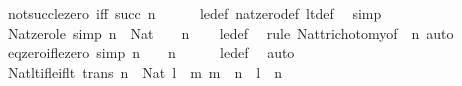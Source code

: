 \begin{isabellebody}
\isanewline
{}\isamarkupfalse%
\ not{\isacharunderscore}{\kern0pt}succ{\isacharunderscore}{\kern0pt}le{\isacharunderscore}{\kern0pt}zero\ {\isacharbrackleft}{\kern0pt}iff{\isacharbrackright}{\kern0pt}{\isacharcolon}{\kern0pt}\ {\isachardoublequoteopen}{\isasymnot}{\isacharparenleft}{\kern0pt}succ\ n\ {\isasymle}\ {}{\isacharparenright}{\kern0pt}{\isachardoublequoteclose}\isanewline
%
\isadelimproof
\ \ %
\endisadelimproof
%
\isatagproof
{}\isamarkupfalse%
\ le{\isacharunderscore}{\kern0pt}def\ nat{\isacharunderscore}{\kern0pt}zero{\isacharunderscore}{\kern0pt}def\ lt{\isacharunderscore}{\kern0pt}def\ \isamarkupfalse%
\ simp%
\endisatagproof
{\isafoldproof}%
%
\isadelimproof
\isanewline
%
\endisadelimproof
\isanewline
{}\isamarkupfalse%
\ Nat{\isacharunderscore}{\kern0pt}zero{\isacharunderscore}{\kern0pt}le\ {\isacharbrackleft}{\kern0pt}simp{\isacharbrackright}{\kern0pt}{\isacharcolon}{\kern0pt}\ {\isachardoublequoteopen}n\ {\isacharcolon}{\kern0pt}\ Nat\ {\isasymLongrightarrow}\ {}\ {\isasymle}\ n{\isachardoublequoteclose}\isanewline
%
\isadelimproof
\ \ %
\endisadelimproof
%
\isatagproof
{}\isamarkupfalse%
\ le{\isacharunderscore}{\kern0pt}def\ \isamarkupfalse%
\ {\isacharparenleft}{\kern0pt}rule\ Nat{\isacharunderscore}{\kern0pt}trichotomy{\isacharbrackleft}{\kern0pt}of\ {}\ n{\isacharbrackright}{\kern0pt}{\isacharparenright}{\kern0pt}\ auto%
\endisatagproof
{\isafoldproof}%
%
\isadelimproof
\isanewline
%
\endisadelimproof
\isanewline
{}\isamarkupfalse%
\ eq{\isacharunderscore}{\kern0pt}zero{\isacharunderscore}{\kern0pt}if{\isacharunderscore}{\kern0pt}le{\isacharunderscore}{\kern0pt}zero\ {\isacharbrackleft}{\kern0pt}simp{\isacharbrackright}{\kern0pt}{\isacharcolon}{\kern0pt}\ {\isachardoublequoteopen}n\ {\isasymle}\ {}\ {\isasymLongrightarrow}\ n\ {\isacharequal}{\kern0pt}\ {}{\isachardoublequoteclose}\isanewline
%
\isadelimproof
\ \ %
\endisadelimproof
%
\isatagproof
{}\isamarkupfalse%
\ le{\isacharunderscore}{\kern0pt}def\ \isamarkupfalse%
\ auto%
\endisatagproof
{\isafoldproof}%
%
\isadelimproof
\isanewline
%
\endisadelimproof
\isanewline
{}\isamarkupfalse%
\ Nat{\isacharunderscore}{\kern0pt}lt{\isacharunderscore}{\kern0pt}if{\isacharunderscore}{\kern0pt}le{\isacharunderscore}{\kern0pt}if{\isacharunderscore}{\kern0pt}lt\ {\isacharbrackleft}{\kern0pt}trans{\isacharbrackright}{\kern0pt}{\isacharcolon}{\kern0pt}\ {\isachardoublequoteopen}{\isasymlbrakk}n\ {\isacharcolon}{\kern0pt}\ Nat{\isacharsemicolon}{\kern0pt}\ l\ {\isacharless}{\kern0pt}\ m{\isacharsemicolon}{\kern0pt}\ m\ {\isasymle}\ n{\isasymrbrakk}\ {\isasymLongrightarrow}\ l\ {\isacharless}{\kern0pt}\ n{\isachardoublequoteclose}\isanewline

\end{isabellebody}
